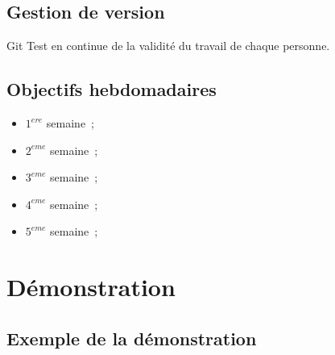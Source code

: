 \documentclass{beamer}
\begin{document}
\subsection{Gestion de version}

\begin{frame}{Git}
	Test en continue de la validité du travail de chaque personne.
\end{frame}

\subsection{Objectifs hebdomadaires}

\begin{frame}
	\begin{itemize}
		\item $1^{ere}$ semaine~;
		\item $2^{eme}$ semaine~;
		\item $3^{eme}$ semaine~;
		\item $4^{eme}$ semaine~;
		\item $5^{eme}$ semaine~;
	\end{itemize}

\end{frame}

\section{Démonstration}

\subsection{Exemple de la démonstration}
\end{document}

